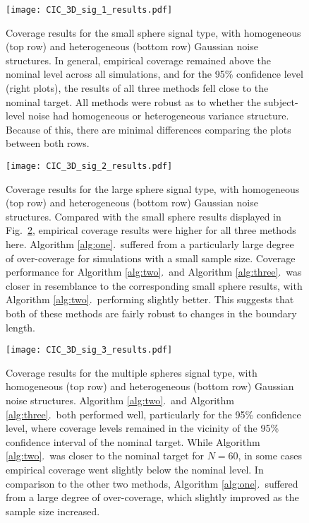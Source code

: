 \begin{figure}[!htbp]
\hspace*{-3.0cm}
\centering
    \texttt{[image: CIC\_3D\_sig\_1\_results.pdf]}
\caption{Coverage results for the small sphere signal type, with homogeneous (top row) and heterogeneous (bottom row) Gaussian noise structures. In general, empirical coverage remained above the nominal level across all simulations, and for the 95\% confidence level (right plots), the results of all three methods fell close to the nominal target. All methods were robust as to whether the subject-level noise had homogeneous or heterogeneous variance structure. Because of this, there are minimal differences comparing the plots between both rows.}
\label{fig:Cohen_3D_sig_1_results}
\end{figure}

\begin{figure}[!htbp]
\hspace*{-3.0cm}
\centering
    \texttt{[image: CIC\_3D\_sig\_2\_results.pdf]}
\caption{Coverage results for the large sphere signal type, with homogeneous (top row) and heterogeneous (bottom row) Gaussian noise structures. Compared with the small sphere results displayed in Fig.\ \ref{fig:Cohen_3D_sig_2_results}, empirical coverage results were higher for all three methods here. Algorithm \ref{alg:one}.\ suffered from a particularly large degree of over-coverage for simulations with a small sample size. Coverage performance for Algorithm \ref{alg:two}.\ and Algorithm \ref{alg:three}.\ was closer in resemblance to the corresponding small sphere results, with Algorithm \ref{alg:two}.\ performing slightly better. This suggests that both of these methods are fairly robust to changes in the boundary length.} 
\label{fig:Cohen_3D_sig_2_results}
\end{figure}

\begin{figure}[!htbp]
\hspace*{-3.0cm}
\centering
    \texttt{[image: CIC\_3D\_sig\_3\_results.pdf]}
\caption{Coverage results for the multiple spheres signal type, with homogeneous (top row) and heterogeneous (bottom row) Gaussian noise structures. Algorithm \ref{alg:two}.\ and Algorithm \ref{alg:three}.\ both performed well, particularly for the 95\% confidence level, where coverage levels remained in the vicinity of the 95\% confidence interval of the nominal target. While Algorithm \ref{alg:two}.\ was closer to the nominal target for $N = 60$, in some cases empirical coverage went slightly below the nominal level. In comparison to the other two methods, Algorithm \ref{alg:one}.\ suffered from a large degree of over-coverage, which slightly improved as the sample size increased.}
\label{fig:Cohen_3D_sig_3_results}
\end{figure}

